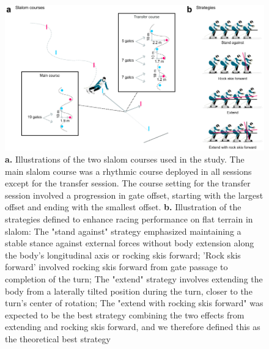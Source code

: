 \documentclass[pdflatex,sn-nature]{sn-jnl}%
\theoremstyle{thmstyleone}%
\theoremstyle{thmstyletwo}%
\theoremstyle{thmstylethree}%
\begin{document}
\begin{figure}[H]
\centering
\includegraphics{figures/figure_method_courseandstrategy.pdf}
\caption{\textbf{a.} Illustrations of the two slalom courses used in the study. The main slalom course was a rhythmic course deployed in all sessions except for the transfer session. The course setting for the transfer session involved a progression in gate offset, starting with the largest offset and ending with the smallest offset. \textbf{b.} Illustration of the strategies defined to enhance racing performance on flat terrain in slalom: The "stand against" strategy emphasized maintaining a stable stance against external forces without body extension along the body's longitudinal axis or rocking skis forward; 'Rock skis forward' involved rocking skis forward from gate passage to completion of the turn; The "extend" strategy involves extending the body from a laterally tilted position during the turn, closer to the turn's center of rotation; The "extend with rocking skis forward" was expected to be the best strategy combining the two effects from extending and rocking skis forward, and we therefore defined this as the theoretical best strategy}
\label{fig:courseandstrategies}
\end{figure}
\end{document}
